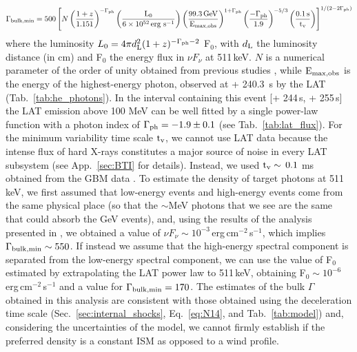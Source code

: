 \documentclass[preprint]{aastex631}
\begin{document}
\begin{equation}\label{eq:Gamma-min}
\Gamma_{\rm bulk,min} = 500\left[N \left(\frac{1+z}{1.151}\right)^{-\Gamma_{\rm ph}}\left(\frac{\rm L_0}{6\times10^{52}\,{\rm erg~s}^{-1}}\right)\left(\frac{99.3\,{\rm GeV}}{\rm E_{\rm max, obs}}\right)^{1+\Gamma_{\rm ph}} \left(\frac{-\Gamma_{\rm ph}}{1.9}\right)^{-5/3}\left(\frac{0.1\,{\rm s}}{\rm t_v}\right)\right]^{1/(2-2\Gamma_{\rm ph})}
\end{equation}
where the luminosity $L_0 = 4 \pi d_{\rm L}^{2} (1+z)^{-\Gamma_{\rm ph}-2}$ F$_0$, with $d_{\rm L}$ the luminosity distance (in cm) and F$_0$ the energy flux in $\nu F_\nu$ at 511\,keV.
$N$ is a numerical parameter of the order of unity obtained from previous studies \citep{2018ApJ...864..163V}, while $\rm E_{\rm max, obs}$ is the energy of the highest-energy photon, observed at \trig + 240.3~s by the LAT (Tab.~\ref{tab:he_photons}). 
In the interval containing this event [\trig + 244\,s, \trig + 255\,s] the LAT emission above 100 MeV can be well fitted by a single power-law function with a photon index of $\Gamma_{\rm ph} = -1.9 \pm 0.1$ (see Tab.~\ref{tab:lat_flux}).  
For the minimum variability time scale $\rm t_v$, we cannot use LAT data because the intense flux of hard X-rays constitutes a major source of noise in every LAT subsystem (see App.~\ref{sec:BTI} for details). Instead, we used $\rm t_v \sim\,0.1$ ms obtained from the GBM data \citep{2023ApJ...952L..42L}.
To estimate the density of target photons at 511\,keV, we first assumed that low-energy events and high-energy events come from the same physical place (so that the $\sim$MeV photons that we see are the same that could absorb the GeV events), and, using the results of the analysis presented in \citet{2023ApJ...952L..42L}, we obtained a value of $\nu F_\nu\sim 10^{-3}$\,erg\,cm$^{-2}$\,s$^{-1}$, which implies $\Gamma_{\rm bulk,min} \sim 550$.
If instead we assume that the high-energy spectral component is separated from the low-energy spectral component, we can use the value of F$_0$ estimated by extrapolating the LAT power law to 511\,keV, obtaining F$_0\sim 10^{-6}$\,erg\,cm$^{-2}$\,s$^{-1}$ and a value for $\Gamma_{\rm bulk,min} = 170$. 
The estimates of the bulk $\Gamma$ obtained in this analysis are consistent with those obtained using the deceleration time scale (Sec.~\ref{sec:internal_shocks}, Eq.~\ref{eq:N14}, and Tab.~\ref{tab:model}) and, considering the uncertainties of the model, we cannot firmly establish if the preferred density is a constant ISM as opposed to a wind profile.
\end{document}
